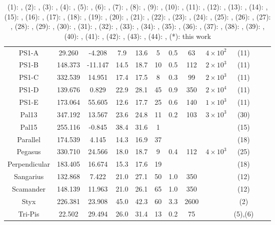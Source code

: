 \begin{table}
\begin{tabular}{cSSSScSccccc}
PS1-A & 29.260 & -4.208 & 7.9 & 13.6 & 5 & 0.5 & 63 & $4 \times 10^{2}$ & (11) \\
PS1-B & 148.373 & -11.147 & 14.5 & 18.7 & 10 & 0.5 & 112 & $2 \times 10^{3}$ & (11) \\
PS1-C & 332.539 & 14.951 & 17.4 & 17.5 & 8 & 0.3 & 99 & $2 \times 10^{3}$ & (11) \\
PS1-D & 139.676 & 0.829 & 22.9 & 28.1 & 45 & 0.9 & 350 & $2 \times 10^{4}$ & (11) \\
PS1-E & 173.064 & 55.605 & 12.6 & 17.7 & 25 & 0.6 & 140 & $1 \times 10^{3}$ & (11) \\
Pal13 & 347.192 & 13.567 & 23.6 & 24.8 & 11 & 0.2 & 103 & $3 \times 10^{3}$ & (30) \\
Pal15 & 255.116 & -0.845 & 38.4 & 31.6 & 1 & & & & (15) \\
Parallel & 174.539 & 4.145 & 14.3 & 16.9 & 37 & & & & (18) \\
Pegasus & 330.710 & 24.566 & 18.0 & 18.7 & 9 & 0.4 & 112 & $4 \times 10^{3}$ & (25) \\
Perpendicular & 183.405 & 16.674 & 15.3 & 17.6 & 19 & & & & (18) \\
Sangarius & 132.868 & 7.422 & 21.0 & 27.1 & 50 & 1.0 & 350 & & (12) \\
Scamander & 148.139 & 11.963 & 21.0 & 26.1 & 65 & 1.0 & 350 & & (12) \\
Styx & 226.381 & 23.908 & 45.0 & 42.3 & 60 & 3.3 & 2600 & & (2) \\
Tri-Pis & 22.502 & 29.494 & 26.0 & 31.4 & 13 & 0.2 & 75 & & (5),(6) \\
\hline \hline
\end{tabular}
\label{tbl:stream-summary}
\caption{(1): \citet{odenkirchen:2009}, (2): \citet{grillmair:2009}, (3): \citet{koposov:2010}, (4): \citet{williams:2011}, (5): \citet{bonaca:2012}, (6): \citet{martin:2013}, (7): \citet{grillmair:2013}, (8): \citet{grillmair:2014}, (9): \citet{sesar:2015}, (10): \citet{kuzma:2015}, (11): \citet{bernard:2016}, (12): \citet{grillmair:2017}, (13): \citet{ibata:2017}, (14): \citet{grillmair:2017b}, (15): \citet{myeong:2017}, (16): \citet{shipp:2018}, (17): \citet{fu:2018}, (18): \citet{weiss:2018}, (19): \citet{mateu:2018}, (20): \citet{jethwa:2018}, (21): \citet{malhan:2018}, (22): \citet{ibata:2019}, (23): \citet{shipp:2019}, (24): \citet{malhan:2019}, (25): \citet{perottoni:2019}, (26): \citet{li:2019}, (27): \citet{ibata:2019b}, (28): \citet{caldwell:2020}, (29): \citet{ji:2020}, (30): \citet{shipp:2020}, (31): \citet{bonaca:2020}, (32): \citet{yuan:2020}, (33): \citet{sollima:2020}, (34): \citet{li:2021}, (35): \citet{gialluca:2021}, (36): \citet{sheffield:2021}, (37): \citet{ibata:2021}, (38): \citet{hansen:2021}, (39): \citet{thomas:2022}, (40): \citet{ferguson:2022}, (41): \citet{li:2022}, (42): \citet{koposov:2023}, (43): \citet{ibata:2023}, (44): \citet{usman:2024}, (*): this work}
\end{table}
